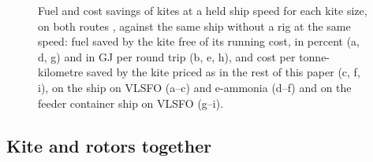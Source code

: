 \begin{figure}[tbp]
\centering
{}
\caption{ Fuel and cost savings of kites at a held ship speed for each kite size, on both routes , against the same ship without a rig at the same speed: fuel saved by the kite free of its running cost, in percent (a, d, g) and in GJ per round trip (b, e, h), and cost per tonne-kilometre saved by the kite priced as in the rest of this paper (c, f, i), on the  ship on VLSFO (a--c) and e-ammonia (d--f) and on the feeder container ship on VLSFO (g--i). }
\label{fig:speed_size}
\end{figure}

\begin{table}[tbp]
\centering
\footnotesize
\caption{ Published fuel savings of ship kites at fixed speed beside our model at the same speed on the nearest of our ships and on the route to New York: with the kite priced as in the rest of this paper, and free of running cost as in the published studies. Covers says what a published figure stands for where that is narrower than a year of trips. Ships, routes, weather and kite models differ, so a row compares terms and not one experiment.  Method study, .}
\label{tab:published}
\end{table}

\subsection{Kite and rotors together}
\label{app:combination}

